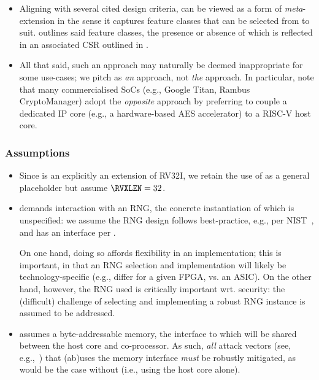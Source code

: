\begin{itemize}
\begin{itemize}
      \end{itemize}

\item Aligning with several cited design criteria, \XCID can be viewed as a
      form of {\em meta}-extension in the sense it captures feature classes
      that can be selected from to suit.   outlines 
      said feature classes, the presence or absence of which is reflected 
      in an associated CSR outlined in .

\item All that said, such an approach may naturally be deemed inappropriate 
      for some use-cases; we pitch \XCID as {\em an} approach, not {\em the}
      approach.  In particular, note that many commercialised SoCs 
      (e.g., Google Titan, Rambus CryptoManager) 
      adopt the {\em opposite} approach by preferring to couple a dedicated
      IP core 
      (e.g., a hardware-based AES accelerator) 
      to a RISC-V host core.


\end{itemize}


\subsubsection{Assumptions}

\begin{itemize}

\item Since \XCID is an explicitly an extension of RV32I, we retain the use
      of \RVXLEN as a general placeholder but assume $\RVXLEN = 32$.

\item \XCID demands interaction with an RNG, the concrete instantiation of 
      which is unspecified: we assume the RNG design follows best-practice,
      e.g., per NIST~\cite{SCARV:NIST:SP:800_90a,SCARV:NIST:SP:800_90b,SCARV:NIST:SP:800_90c},
      and has an interface per \cite[Section 6.4]{SCARV:NIST:SP:800_90c}.

      On one hand, doing so affords flexibility in an implementation; this 
      is important, in that an RNG selection and implementation will likely 
      be technology-specific (e.g., differ for a given FPGA, vs. an ASIC).  
      On the other hand, however, the RNG used is critically important wrt. 
      security: the (difficult) challenge of selecting and implementing 
      a robust RNG instance is assumed to be addressed.

\item \XCID assumes a byte-addressable memory, the interface to which will
      be shared between the host core and co-processor.  As such, {\em all}
      attack vectors
      (see, e.g.,~\cite{SCARV:GYCH:18})
      that (ab)uses the memory interface {\em must} be robustly mitigated, 
      as would be the case without \XCID (i.e., using the host core alone).

\end{itemize}

